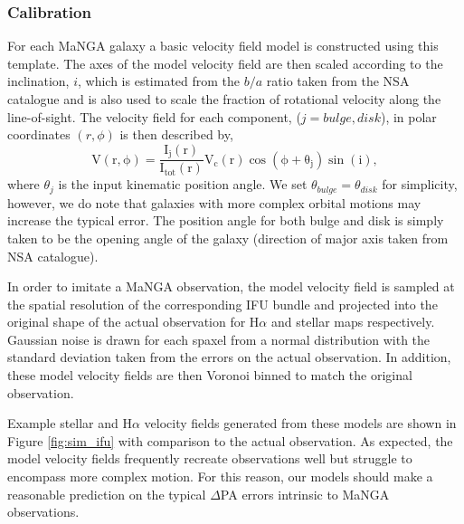 \subsubsection{Calibration}
For each MaNGA galaxy a basic velocity field model is constructed using this template. The axes of the model velocity field are then scaled according to the inclination, $i$, which is estimated from the $b/a$ ratio taken from the NSA catalogue and is also used to scale the fraction of rotational velocity along the line-of-sight. The velocity field for each component, ($j=bulge,disk$), in polar coordinates $(r,\phi)$ is then described by,
\begin{equation}
\mathrm{V(r,\phi) = \frac{I_{j}(r)}{I_{tot}(r)}V_{c}(r)\cos(\phi+\theta_{j})\sin(i)},
\end{equation}
where $\theta_j$ is the input kinematic position angle. We set $\theta_{bulge} = \theta_{disk}$ for simplicity, however, we do note that galaxies with more complex orbital motions may increase the typical error. The position angle for both bulge and disk is simply taken to be the opening angle of the galaxy (direction of major axis taken from NSA catalogue). 

In order to imitate a MaNGA observation, the model velocity field is sampled at the spatial resolution of the corresponding IFU bundle and projected into the original shape of the actual observation for H$\alpha$ and stellar maps respectively. Gaussian noise is drawn for each spaxel from a normal distribution with the standard deviation taken from the errors on the actual observation. In addition, these model velocity fields are then Voronoi binned to match the original observation.

Example stellar and H$\alpha$ velocity fields generated from these models are shown in Figure \ref{fig:sim_ifu} with comparison to the actual observation. As expected, the model velocity fields frequently recreate observations well but struggle to encompass more complex motion. For this reason, our models should make a reasonable prediction on the typical $\Delta$PA errors intrinsic to MaNGA observations.


